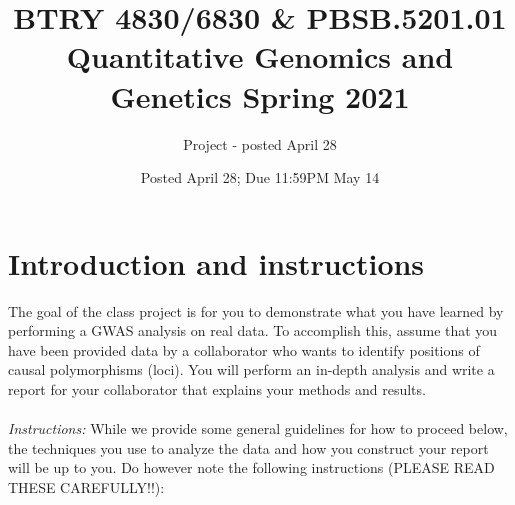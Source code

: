 \documentclass[letterpaper, 11pt]{article}
\title{BTRY 4830/6830 \& PBSB.5201.01 \\
Quantitative Genomics and Genetics Spring 2021
}
\author{Project - posted April 28}
\date{Posted April 28; Due 11:59PM May 14 }
\begin{document}
\vspace{-20in}

\maketitle

\section{Introduction and instructions}

The goal of the class project is for you to demonstrate what you have learned by performing a GWAS analysis on real data. To accomplish this, assume that you have been provided data by a collaborator who wants to identify positions of causal polymorphisms (loci). You will perform an in-depth analysis and write a report for your collaborator that explains your methods and results.\\
\\
\textit{Instructions:} While we provide some general guidelines for how to proceed below, the techniques you use to analyze the data and how you construct your report will be up to you. Do however note the following instructions (PLEASE READ THESE CAREFULLY!!):
\end{document}
